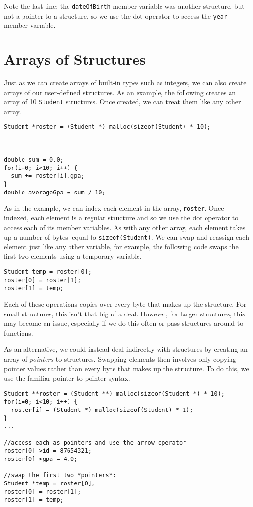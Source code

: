 Note the last line: the \texttt{dateOfBirth} member variable
was another structure, but not a pointer to a structure, so we
use the dot operator to access the \texttt{year} member
variable.

\section{Arrays of Structures}

Just as we can create arrays of built-in types such as integers, 
we can also create arrays of our user-defined structures.  As
an example, the following creates an array of 10 \texttt{Student}
structures.  Once created, we can treat them like any other
array.  

\begin{verbatim}
Student *roster = (Student *) malloc(sizeof(Student) * 10);

...

double sum = 0.0;
for(i=0; i<10; i++) {
  sum += roster[i].gpa;
}
double averageGpa = sum / 10;
\end{verbatim}

As in the example, we can index each element in the array, 
\texttt{roster}.  Once indexed, each element is a 
regular structure and so we use the dot operator to access
each of its member variables.  As with any other array, 
each element takes up a number of bytes, equal to 
\texttt{sizeof(Student)}.  We can swap and reassign
each element just like any other variable, for example, 
the following code swaps the first two elements using
a temporary variable.

\begin{verbatim}
Student temp = roster[0];
roster[0] = roster[1];
roster[1] = temp;
\end{verbatim}

Each of these operations copies over every byte that makes up
the structure.  For small structures, this isn't that big of
a deal.  However, for larger structures, this may become an
issue, especially if we do this often or pass structures around
to functions.

As an alternative, we could instead deal indirectly with structures
by creating an array of \emph{pointers} to structures.  Swapping
elements then involves only copying pointer values rather than
every byte that makes up the structure.  To do this, we use
the familiar pointer-to-pointer syntax.

\begin{verbatim}
Student **roster = (Student **) malloc(sizeof(Student *) * 10);
for(i=0; i<10; i++) {
  roster[i] = (Student *) malloc(sizeof(Student) * 1);
}
...

//access each as pointers and use the arrow operator
roster[0]->id = 87654321;
roster[0]->gpa = 4.0;

//swap the first two *pointers*:
Student *temp = roster[0];
roster[0] = roster[1];
roster[1] = temp;
\end{verbatim}

